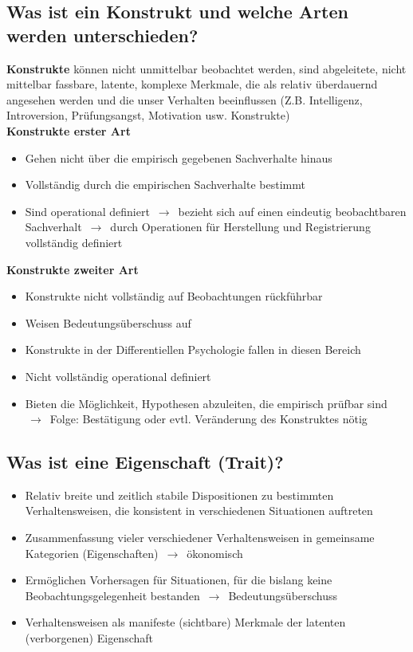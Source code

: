 \documentclass[a6paper,10pt,DIV=40]{scrartcl}
\begin{document}
\subsection{Was ist ein Konstrukt und welche Arten werden unterschieden?}
    \textbf{Konstrukte} können nicht unmittelbar beobachtet werden, sind abgeleitete, nicht mittelbar fassbare, latente, komplexe Merkmale, die als relativ überdauernd angesehen werden und die unser Verhalten beeinflussen (Z.B. Intelligenz, Introversion, Prüfungsangst, Motivation usw. Konstrukte)\\
    \textbf{Konstrukte erster Art}
    \begin{itemize}\itemsep-0.5ex
        \item Gehen nicht über die empirisch gegebenen Sachverhalte hinaus
        \item Vollständig durch die empirischen Sachverhalte bestimmt
        \item Sind operational definiert $\,\to\,$ bezieht sich auf einen eindeutig beobachtbaren Sachverhalt $\,\to\,$ durch Operationen für Herstellung und Registrierung vollständig definiert
    \end{itemize}
    \textbf{Konstrukte zweiter Art}
    \begin{itemize}\itemsep-0.5ex
        \item Konstrukte nicht vollständig auf Beobachtungen rückführbar
        \item Weisen Bedeutungsüberschuss auf
        \item Konstrukte in der Differentiellen Psychologie fallen in diesen Bereich
        \item Nicht vollständig operational definiert
        \item Bieten die Möglichkeit, Hypothesen abzuleiten, die empirisch prüfbar sind $\,\to\,$ Folge: Bestätigung oder evtl. Veränderung des Konstruktes nötig
    \end{itemize}
\subsection{Was ist eine Eigenschaft (Trait)?}
    \begin{itemize}\itemsep-0.5ex
        \item Relativ breite und zeitlich stabile Dispositionen zu bestimmten
    Verhaltensweisen, die konsistent in verschiedenen Situationen auftreten
        \item Zusammenfassung vieler verschiedener Verhaltensweisen in
    gemeinsame Kategorien (Eigenschaften) $\,\to\,$ ökonomisch
        \item Ermöglichen Vorhersagen für Situationen, für die bislang keine
    Beobachtungsgelegenheit bestanden $\,\to\,$ Bedeutungsüberschuss
        \item Verhaltensweisen als manifeste (sichtbare) Merkmale der latenten
    (verborgenen) Eigenschaft
    \end{itemize}
\end{document}
